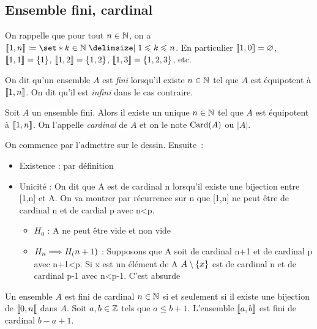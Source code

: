 \documentclass{magnolia}
\begin{document}
\subsection{Ensemble fini, cardinal}

On rappelle que pour tout $n\in\mathbb{N}$, on a $\intere{1}{n}\defeq\enstq{k\in\N}{1\leq k\leq n}$.
En particulier $\left\llbracket 1,0\right\rrbracket=\varnothing$, $\left\llbracket 1,1\right\rrbracket=\left\{1\right\}$,
$\left\llbracket 1,2\right\rrbracket=\left\{1, 2\right\}$, $\left\llbracket 1,3\right\rrbracket=\left\{1, 2, 3\right\}$, etc. 
\vspace{2ex}
\begin{definition}
On dit qu'un ensemble $A$ est \emph{fini} lorsqu'il existe $n\in\mathbb{N}$ tel que $A$ est
équipotent à $\left\llbracket 1,n\right\rrbracket$. On dit qu'il est \emph{infini} dans le cas contraire.
\end{definition}

\begin{definition}
Soit $A$ un ensemble fini. Alors il existe un unique $n\in\mathbb{N}$ tel que $A$ est
équipotent à $\left\llbracket 1,n\right\rrbracket$. On l'appelle \emph{cardinal} de $A$ et on le note
$\operatorname{Card}(A)$ ou $|A|$.
\end{definition}

\begin{preuve}
On commence par l'admettre sur le dessin. Ensuite~:
\begin{itemize}
\item Existence : par définition
\item Unicité : On dit que A est de cardinal n lorsqu'il existe une bijection
  entre [1,n] et A.
  On va montrer par récurrence sur n que [1,n] ne peut être de
  cardinal n et de cardial p avec n<p.
  \begin{itemize}
  \item $H_0$ : A ne peut être vide et non vide
  \item $H_n \Longrightarrow H_(n+1)$ : Supposons que A soit de cardinal n+1 et de
     cardinal p avec
     n+1<p. Si x est un élément de A $A\setminus\left\{x\right\}$ est de cardinal n et de
     cardinal p-1 avec n<p-1. C'est absurde
  \end{itemize}
\end{itemize}
\end{preuve}

\begin{remarques}
  \remarque Un ensemble $A$ est fini de cardinal $n\in\mathbb{N}$ si et seulement si il existe une
    bijection de $\left\llbracket 0,n\right\llbracket$ dans $A$.
  \remarque Soit $a,b\in\mathbb{Z}$ tels que $a\leq b + 1$. L'ensemble $\left\llbracket a,b\right\rrbracket$ est fini de
  cardinal $b-a+1$.
\end{remarques}
\end{document}
